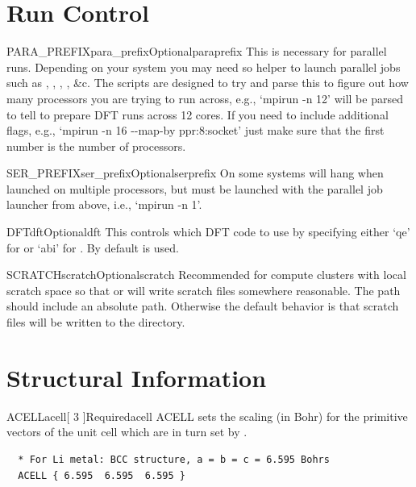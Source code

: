 \documentclass[11pt]{report}
\begin{document}
\section{Run Control}
\label{sec:Run-Control}


\begin{Card}{PARA\_PREFIX}{para\_prefix}{Optional}{paraprefix}
This is necessary for parallel runs. Depending on your system you may need so helper to launch parallel jobs such as , 
, , , \&c. 
The  scripts are designed to try and parse this to figure out how many processors you are trying to run across, e.g., `mpirun -n 12' will be parsed to tell  to prepare DFT runs across 12 cores. 
If you need to include additional flags, e.g., `mpirun -n 16 -{}-map-by ppr:8:socket' just make sure that the first number is the number of processors.
\end{Card}

\begin{Card}{SER\_PREFIX}{ser\_prefix}{Optional}{serprefix}
On some systems  will hang when launched on multiple processors, but must be launched with the parallel job launcher from above, i.e., `mpirun -n 1'.
\end{Card}

\begin{Card}{DFT}{dft}{Optional}{dft}
This controls which DFT code to use by specifying either `qe' for  or `abi' for . 
By default  is used.
\end{Card}

\begin{Card}{SCRATCH}{scratch}{Optional}{scratch}
Recommended for compute clusters with local scratch space so that  or  
will write scratch files somewhere reasonable. The path  should include an absolute path. Otherwise the default 
behavior is that scratch files will be written to the  directory. 
\end{Card}


\section{Structural Information}
\label{sec:Structural-Information}



\begin{Card}{ACELL}{acell[ 3 ]}{Required}{acell}
  ACELL sets the scaling (in Bohr) for the primitive vectors of the unit cell which are in turn set by .

\begin{verbatim}
  * For Li metal: BCC structure, a = b = c = 6.595 Bohrs
  ACELL { 6.595  6.595  6.595 }
  
  \end{verbatim}
\end{Card}
\end{document}
